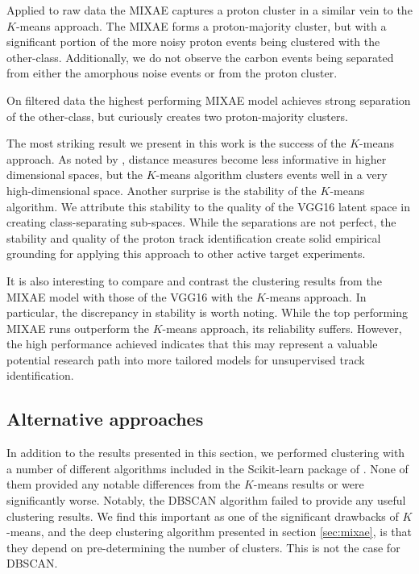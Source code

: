 \documentclass[review,sort&compress]{elsarticle}
\begin{document}
Applied to raw data the MIXAE captures a proton cluster in a similar vein to the $K$-means approach. The MIXAE forms a proton-majority cluster, but with a significant portion of the more noisy proton events being clustered with the other-class. Additionally, we do not observe the carbon events being separated from either the amorphous noise events or from the proton cluster. 

On filtered data the highest performing MIXAE model achieves strong separation of the other-class, but curiously creates two proton-majority clusters.
 


The most striking result we present in this work is the success of the $K$-means approach. As noted by \cite{Aggarwal}, distance measures become less informative in higher dimensional spaces, but the $K$-means algorithm clusters events well in a very high-dimensional space.
Another surprise is the stability of the $K$-means algorithm. We attribute this stability to the quality of the VGG16 latent space in creating class-separating sub-spaces. While the separations are not perfect, the stability and quality of the proton track identification create solid empirical grounding for applying this approach to other active target experiments. 


It is also interesting to compare and contrast the clustering results from the MIXAE model with those of the VGG16 with the  $K$-means approach. In particular, the discrepancy in stability is worth noting. While the top performing MIXAE runs outperform the $K$-means approach, its reliability suffers. However, the high performance achieved indicates that this may represent a valuable potential research path into more tailored models for unsupervised track identification.


\subsection{Alternative approaches}

In addition to the results presented in this section, we performed clustering with a number of different algorithms included in the Scikit-learn package of \citet{Pedregosa2011}. None of them provided any notable differences from the $K$-means results or were significantly worse. Notably, the DBSCAN algorithm \cite{Ester96adensity-based,Bergstra2012} failed to provide any useful clustering results. We find this important as one of the significant drawbacks of $K$-means, and the deep clustering algorithm presented in section \ref{sec:mixae}, is that they depend  on pre-determining the number of clusters. This is not the case for DBSCAN. 
\end{document}

